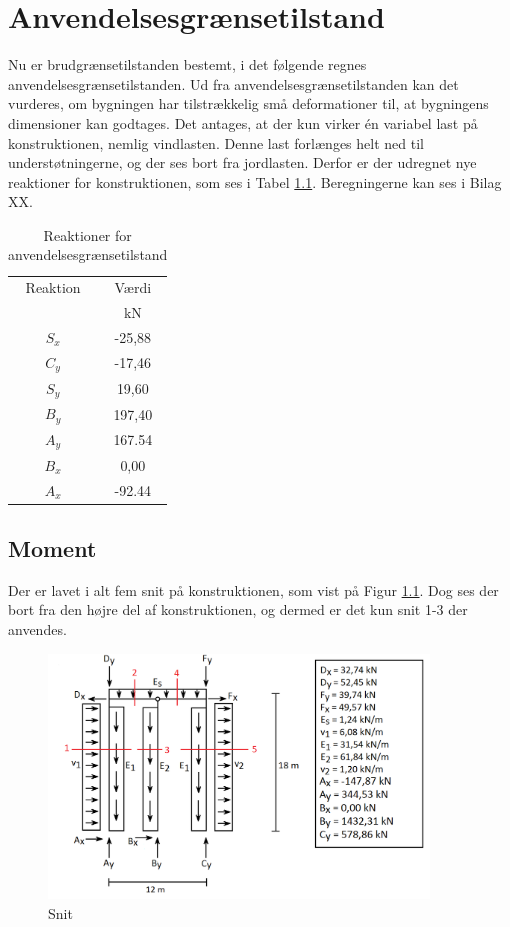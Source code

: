 \chapter{Anvendelsesgrænsetilstand}
Nu er brudgrænsetilstanden bestemt, i det følgende regnes anvendelsesgrænsetilstanden. Ud fra anvendelsesgrænsetilstanden kan det vurderes, om bygningen har tilstrækkelig små deformationer til, at bygningens dimensioner kan godtages. 
\newline \indent{     }  Det antages, at der kun virker én variabel last på konstruktionen, nemlig vindlasten. Denne last forlænges helt ned til understøtningerne, og der ses bort fra jordlasten. Derfor er der udregnet nye reaktioner for konstruktionen, som ses i Tabel \ref{tab:anden}. Beregningerne kan ses i Bilag XX. 

\begin{table}
	\begin{center}
		\begin{tabular}{ c c }
			\hline
			Reaktion & Værdi \\
			& kN \\ \hline
			$S_x$ & -25,88 	\\
			$C_y$ & -17,46  \\
			$S_y$ & 19,60 	\\
			$B_y$ & 197,40	\\
			$A_y$ & 167.54 	\\
			$B_x$ & 0,00 	\\
			$A_x$ & -92.44 	\\
		\end{tabular}
		\caption{Reaktioner for anvendelsesgrænsetilstand}
		\label{tab:anden}
	\end{center}
\end{table}

\section{Moment}
Der er lavet i alt fem snit på konstruktionen, som vist på Figur \ref{fig:snitanvendelse}. Dog ses der bort fra den højre del af konstruktionen, og dermed er det kun snit 1-3 der anvendes. 

\begin{figure}[H]
	\centering
	\includegraphics[width=0.9\textwidth]{billeder/snitanvendelse.png}
	\caption{Snit}
	\label{fig:snitanvendelse}
\end{figure}

